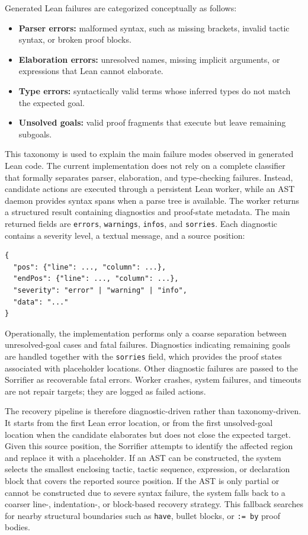\documentclass[en]{uet_awesome_thesis/uet-awesome-thesis}
\begin{document}
Generated Lean failures are categorized conceptually as follows:
\begin{itemize}
    \item \textbf{Parser errors:} malformed syntax, such as missing brackets, invalid tactic syntax, or broken proof blocks.
    \item \textbf{Elaboration errors:} unresolved names, missing implicit arguments, or expressions that Lean cannot elaborate.
    \item \textbf{Type errors:} syntactically valid terms whose inferred types do not match the expected goal.
    \item \textbf{Unsolved goals:} valid proof fragments that execute but leave remaining subgoals.
\end{itemize}

This taxonomy is used to explain the main failure modes observed in generated Lean code. The current
implementation does not rely on a complete classifier that formally separates parser, elaboration, and
type-checking failures. Instead, candidate actions are executed through a persistent Lean worker, while
an AST daemon provides syntax spans when a parse tree is available. The worker returns a structured
result containing diagnostics and proof-state metadata. The main returned fields are
\texttt{errors}, \texttt{warnings}, \texttt{infos}, and \texttt{sorries}. Each diagnostic contains a severity level,
a textual message, and a source position:
\begin{verbatim}
{
  "pos": {"line": ..., "column": ...},
  "endPos": {"line": ..., "column": ...},
  "severity": "error" | "warning" | "info",
  "data": "..."
}
\end{verbatim}

Operationally, the implementation performs only a coarse separation between unresolved-goal cases and
fatal failures. Diagnostics indicating remaining goals are handled together with the \texttt{sorries} field,
which provides the proof states associated with placeholder locations. Other diagnostic failures are passed
to the Sorrifier as recoverable fatal errors. Worker crashes, system failures, and timeouts are not
repair targets; they are logged as failed actions.

The recovery pipeline is therefore diagnostic-driven rather than taxonomy-driven. It starts from the
first Lean error location, or from the first unsolved-goal location when the candidate elaborates but does
not close the expected target. Given this source position, the Sorrifier attempts to identify the
affected region and replace it with a placeholder. If an AST can be constructed, the system selects the
smallest enclosing tactic, tactic sequence, expression, or declaration block that covers the reported
source position. If the AST is only partial or cannot be constructed due to severe syntax failure, the
system falls back to a coarser line-, indentation-, or block-based recovery strategy. This fallback
searches for nearby structural boundaries such as \texttt{have}, bullet blocks, or \texttt{:= by} proof bodies.
\end{document}
